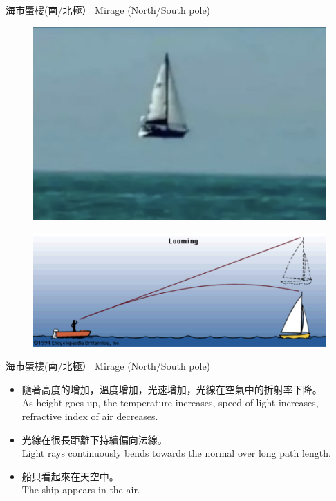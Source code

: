 \documentclass[beamer=true]{standalone}
\begin{document}
\begin{frame}{海市蜃樓(南/北極） Mirage (North/South pole)}
    \begin{figure}
        \centering
        \includegraphics[width=0.5\linewidth]{assets/dijhheu32.png}
        
        
    \end{figure}
    \begin{figure}
        \centering
        \includegraphics[width=0.75\linewidth]{assets/89xu0n908u12r.png}
        
        
    \end{figure}
\end{frame}
\begin{frame}{海市蜃樓(南/北極） Mirage (North/South pole)}
    \begin{itemize}
        \item 隨著高度的增加，溫度增加，光速增加，光線在空氣中的折射率下降。\\As height goes up, the temperature increases, speed of light increases, refractive index of air decreases.
        \item 光線在很長距離下持續偏向法線。\\Light rays continuously bends towards the normal over long path length.
        \item 船只看起來在天空中。\\The ship appears in the air.
        
    \end{itemize}

\end{frame}
\end{document}

